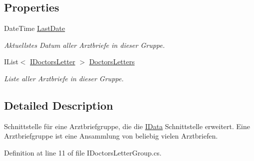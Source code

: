 \subsection*{Properties}
\begin{CompactItemize}
\item 
\hypertarget{interfacemy_m_d_1_1_model_interface_1_1_data_model_interface_1_1_i_doctors_letter_group_60f35d38f828e2c77f5243ebabc0e64b}{
Date\-Time \hyperlink{interfacemy_m_d_1_1_model_interface_1_1_data_model_interface_1_1_i_doctors_letter_group_60f35d38f828e2c77f5243ebabc0e64b}{Last\-Date}}
\label{d1/df0/interfacemy_m_d_1_1_model_interface_1_1_data_model_interface_1_1_i_doctors_letter_group_60f35d38f828e2c77f5243ebabc0e64b}

\begin{CompactList}\small\item\em Aktuellstes Datum aller Arztbriefe in dieser Gruppe. \item\end{CompactList}\item 
\hypertarget{interfacemy_m_d_1_1_model_interface_1_1_data_model_interface_1_1_i_doctors_letter_group_54718291c29adece386cab47aaf27f45}{
IList$<$ \hyperlink{interfacemy_m_d_1_1_model_interface_1_1_data_model_interface_1_1_i_doctors_letter}{IDoctors\-Letter} $>$ \hyperlink{interfacemy_m_d_1_1_model_interface_1_1_data_model_interface_1_1_i_doctors_letter_group_54718291c29adece386cab47aaf27f45}{Doctors\-Letters}}
\label{d1/df0/interfacemy_m_d_1_1_model_interface_1_1_data_model_interface_1_1_i_doctors_letter_group_54718291c29adece386cab47aaf27f45}

\begin{CompactList}\small\item\em Liste aller Arztbriefe in dieser Gruppe. \item\end{CompactList}\end{CompactItemize}


\subsection{Detailed Description}
Schnittstelle f\"{u}r eine Arztbriefgruppe, die die \hyperlink{interfacemy_m_d_1_1_model_interface_1_1_data_model_interface_1_1_i_data}{IData} Schnittstelle erweitert. Eine Arztbriefgruppe ist eine Ansammlung von beliebig vielen Arztbriefen. 



Definition at line 11 of file IDoctors\-Letter\-Group.cs.

